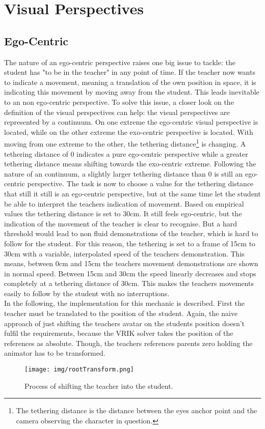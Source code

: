 \newpage
\section{Visual Perspectives}
\subsection{Ego-Centric}
The nature of an ego-centric perspective raises one big issue to tackle: the student has "to be in the teacher" in any point of time. If the teacher now wants to indicate a movement, meaning a translation of the own position in space, it is indicating this movement by moving away from the student. This leads inevitable to an non ego-centric perspective. To solve this issue, a closer look on the definition of the visual perspectives can help: the visual perspectives are represented by a continuum. On one extreme the ego-centric visual perspective is located, while on the other extreme the exo-centric perspective is located. With moving from one extreme to the other, the tethering distance\footnote{The tethering distance is the distance between the eyes anchor point and the camera observing the character in question.} is changing. A tethering distance of 0 indicates a pure ego-centric perspective while a greater tethering distance means shifting towards the exo-centric extreme. Following the nature of an continuum, a slightly larger tethering distance than 0 is still an ego-centric perspective. The task is now to choose a value for the tethering distance that still it still is an ego-centric perspective, but at the same time let the student be able to interpret the teachers indication of movement. 
Based on empirical values the tethering distance is set to 30cm. It still feels ego-centric, but the indication of the movement of the teacher is clear to recognise. But a hard threshold would lead to non fluid demonstrations of the teacher, which is hard to follow for the student. For this reason, the tethering is set to a frame of 15cm to 30cm with a variable, interpolated speed of the teachers demonstration. This means, between 0cm and 15cm the teachers movement demonstrations are shown in normal speed. Between 15cm and 30cm the speed linearly decreases and stops completely at a tethering distance of 30cm. This makes the teachers movements easily to follow by the student with no interruptions.\\
In the following, the implementation for this mechanic is described. First the teacher must be translated to the position of the student. Again, the naive approach of just shifting the teachers avatar on the students position doesn't fulfil the requirements, because the VRIK solver takes the position of the references as absolute. Though, the teachers references parents zero holding the animator has to be transformed.
\begin{figure}
	\centering
	\texttt{[image: img/rootTransform.png]}
	\caption{Process of shifting the teacher into the student.}
	\label{fig:rootRansform}
\end{figure}

